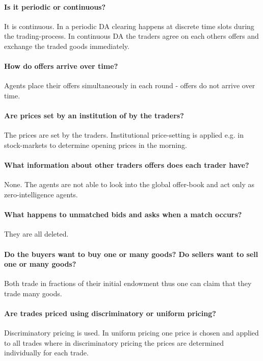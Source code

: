 \documentclass[../Bachelorarbeit.tex]{subfiles}
\begin{document}
\paragraph{Is it periodic or continuous?} It is continuous. In a periodic DA clearing happens at discrete time slots during the trading-process. In continuous DA the traders agree on each others offers and exchange the traded goods immediately.

\paragraph{How do offers arrive over time?} Agents place their offers simultaneously in each round - offers do not arrive over time.

\paragraph{Are prices set by an institution of by the traders?} The prices are set by the traders. Institutional price-setting is applied e.g. in stock-markets to determine opening prices in the morning.

\paragraph{What information about other traders offers does each trader have?} None. The agents are not able to look into the global offer-book and act only as zero-intelligence agents.

\paragraph{What happens to unmatched bids and asks when a match occurs?} They are all deleted.

\paragraph{Do the buyers want to buy one or many goods? Do sellers want to sell one or many goods?} Both trade in fractions of their initial endowment thus one can claim that they trade many goods.

\paragraph{Are trades priced using discriminatory or uniform pricing?} Discriminatory pricing is used. In uniform pricing one price is chosen and applied to all trades where in discriminatory pricing the prices are determined individually for each trade. 
\end{document}
